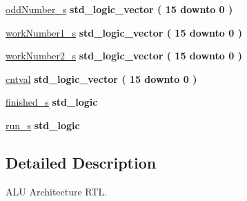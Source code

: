 \begin{DoxyCompactItemize}
\item 
\hyperlink{classalu_1_1rtl_abbb4b5217cc95fa9082d739d51bdeab8}{odd\+Number\+\_\+s} {\bfseries \textcolor{comment}{std\+\_\+logic\+\_\+vector}\textcolor{vhdlchar}{ }\textcolor{vhdlchar}{(}\textcolor{vhdlchar}{ }\textcolor{vhdlchar}{ } \textcolor{vhdldigit}{15} \textcolor{vhdlchar}{ }\textcolor{keywordflow}{downto}\textcolor{vhdlchar}{ }\textcolor{vhdlchar}{ } \textcolor{vhdldigit}{0} \textcolor{vhdlchar}{ }\textcolor{vhdlchar}{)}\textcolor{vhdlchar}{ }} 
\item 
\hyperlink{classalu_1_1rtl_a5a831871c33fc7a57d57212ac50a2087}{work\+Number1\+\_\+s} {\bfseries \textcolor{comment}{std\+\_\+logic\+\_\+vector}\textcolor{vhdlchar}{ }\textcolor{vhdlchar}{(}\textcolor{vhdlchar}{ }\textcolor{vhdlchar}{ } \textcolor{vhdldigit}{15} \textcolor{vhdlchar}{ }\textcolor{keywordflow}{downto}\textcolor{vhdlchar}{ }\textcolor{vhdlchar}{ } \textcolor{vhdldigit}{0} \textcolor{vhdlchar}{ }\textcolor{vhdlchar}{)}\textcolor{vhdlchar}{ }} 
\item 
\hyperlink{classalu_1_1rtl_afabe271df421708b7490fb85875a5d89}{work\+Number2\+\_\+s} {\bfseries \textcolor{comment}{std\+\_\+logic\+\_\+vector}\textcolor{vhdlchar}{ }\textcolor{vhdlchar}{(}\textcolor{vhdlchar}{ }\textcolor{vhdlchar}{ } \textcolor{vhdldigit}{15} \textcolor{vhdlchar}{ }\textcolor{keywordflow}{downto}\textcolor{vhdlchar}{ }\textcolor{vhdlchar}{ } \textcolor{vhdldigit}{0} \textcolor{vhdlchar}{ }\textcolor{vhdlchar}{)}\textcolor{vhdlchar}{ }} 
\item 
\hyperlink{classalu_1_1rtl_a74b7ca57b190cd19236486417a61d566}{cntval} {\bfseries \textcolor{comment}{std\+\_\+logic\+\_\+vector}\textcolor{vhdlchar}{ }\textcolor{vhdlchar}{(}\textcolor{vhdlchar}{ }\textcolor{vhdlchar}{ } \textcolor{vhdldigit}{15} \textcolor{vhdlchar}{ }\textcolor{keywordflow}{downto}\textcolor{vhdlchar}{ }\textcolor{vhdlchar}{ } \textcolor{vhdldigit}{0} \textcolor{vhdlchar}{ }\textcolor{vhdlchar}{)}\textcolor{vhdlchar}{ }} 
\item 
\hyperlink{classalu_1_1rtl_abb13f4e66b38434991c4a6e11a842d8e}{finished\+\_\+s} {\bfseries \textcolor{comment}{std\+\_\+logic}\textcolor{vhdlchar}{ }} 
\item 
\hyperlink{classalu_1_1rtl_af4334e2915fc133abca5cbbac4312fcf}{run\+\_\+s} {\bfseries \textcolor{comment}{std\+\_\+logic}\textcolor{vhdlchar}{ }} 
\end{DoxyCompactItemize}


\subsection{Detailed Description}
A\+LU Architecture R\+TL. 

